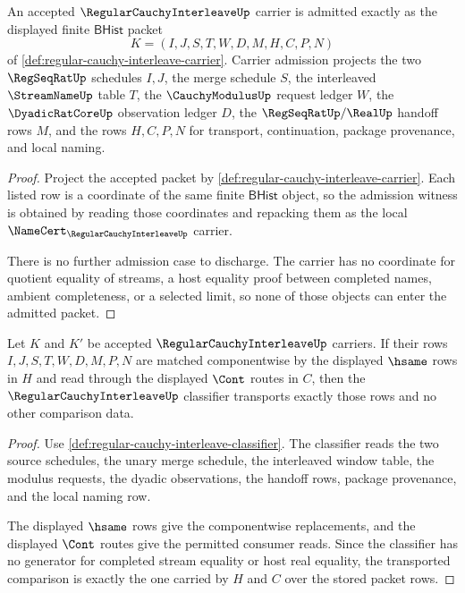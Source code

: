 \begin{theorem}
\label{thm:regular-cauchy-interleave-carrier-admission}
An accepted $\RegularCauchyInterleaveUp$ carrier is admitted exactly as the displayed finite $\mathsf{BHist}$ packet
$$
K=(I,J,S,T,W,D,M,H,C,P,N)
$$
of \autoref{def:regular-cauchy-interleave-carrier}. Carrier admission projects the two $\RegSeqRatUp$ schedules $I,J$, the merge schedule $S$, the interleaved $\StreamNameUp$ table $T$, the $\CauchyModulusUp$ request ledger $W$, the $\DyadicRatCoreUp$ observation ledger $D$, the $\RegSeqRatUp/\RealUp$ handoff rows $M$, and the rows $H,C,P,N$ for transport, continuation, package provenance, and local naming.
\end{theorem}
\begin{proof}
Project the accepted packet by \autoref{def:regular-cauchy-interleave-carrier}. Each listed row is a coordinate of the same finite $\mathsf{BHist}$ object, so the admission witness is obtained by reading those coordinates and repacking them as the local $\NameCert_{\RegularCauchyInterleaveUp}$ carrier.

There is no further admission case to discharge. The carrier has no coordinate for quotient equality of streams, a host equality proof between completed names, ambient completeness, or a selected limit, so none of those objects can enter the admitted packet.
\end{proof}

\begin{theorem}
\label{thm:regular-cauchy-interleave-classifier-transport-exactness}
Let $K$ and $K'$ be accepted $\RegularCauchyInterleaveUp$ carriers. If their rows $I,J,S,T,W,D,M,P,N$ are matched componentwise by the displayed $\hsame$ rows in $H$ and read through the displayed $\Cont$ routes in $C$, then the $\RegularCauchyInterleaveUp$ classifier transports exactly those rows and no other comparison data.
\end{theorem}
\begin{proof}
Use \autoref{def:regular-cauchy-interleave-classifier}. The classifier reads the two source schedules, the unary merge schedule, the interleaved window table, the modulus requests, the dyadic observations, the handoff rows, package provenance, and the local naming row.

The displayed $\hsame$ rows give the componentwise replacements, and the displayed $\Cont$ routes give the permitted consumer reads. Since the classifier has no generator for completed stream equality or host real equality, the transported comparison is exactly the one carried by $H$ and $C$ over the stored packet rows.
\end{proof}

